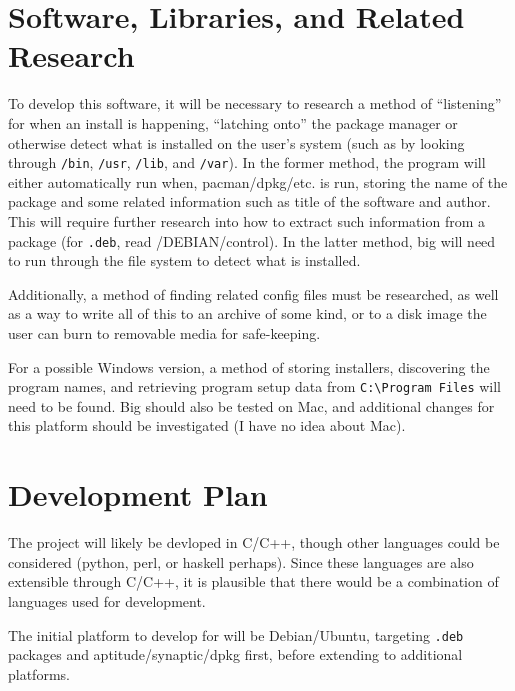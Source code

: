 \documentclass[12pt]{article}
\begin{document}
    \section{Software, Libraries, and Related Research}
        To develop this software, it will be necessary to research a method of ``listening'' for when an install is happening, ``latching onto'' the package manager or otherwise detect what is installed on the user's system (such as by looking through \verb+/bin+, \verb+/usr+, \verb+/lib+, and \verb+/var+).  In the former method, the program will either automatically run when, pacman/dpkg/etc. is run, storing the name of the package and some related information such as title of the software and author.  This will require further research into how to extract such information from a package (for \verb+.deb+, read /DEBIAN/control).  In the latter method, big will need to run through the file system to detect what is installed.

        Additionally, a method of finding related config files must be researched, as well as a way to write all of this to an archive of some kind, or to a disk image the user can burn to removable media for safe-keeping.

        For a possible Windows version, a method of storing installers, discovering the program names, and retrieving program setup data from \verb+C:\Program Files+ will need to be found.  Big should also be tested on Mac, and additional changes for this platform should be investigated (I have no idea about Mac).
    \section{Development Plan}
        The project will likely be devloped in C/C++, though other languages could be considered (python, perl, or haskell perhaps).  Since these languages are also extensible through C/C++, it is plausible that there would be a combination of languages used for development.

        The initial platform to develop for will be Debian/Ubuntu, targeting \verb+.deb+ packages and aptitude/synaptic/dpkg first, before extending to additional platforms.
    
\end{document}
